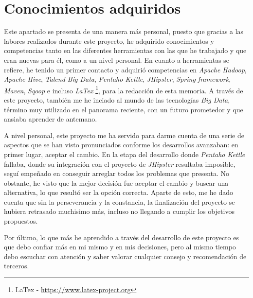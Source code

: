 \section{Conocimientos adquiridos} \label{conclusiones.conocimientos}
Este apartado se presenta de una manera más personal, puesto que gracias a las labores realizados durante este proyecto, he adquirido conocimientos y competencias tanto en las diferentes herramientas con las que he trabajado y que eran nuevas para él, como a un nivel personal. En cuanto a herramientas se refiere, he tenido un primer contacto y adquirió competencias en \textit{Apache Hadoop}, \textit{Apache Hive}, \textit{Talend Big Data}, \textit{Pentaho Kettle}, \textit{JHipster}, \textit{Spring framework}, \textit{Maven}, \textit{Sqoop} e incluso \textit{LaTex} \footnote{LaTex - \url{https://www.latex-project.org}}, para la redacción de esta memoria. A través de este proyecto, también me he inciado al mundo de las tecnologías \textit{Big Data}, término muy utilizado en el panorama reciente,  con un futuro prometedor y que ansiaba aprender de antemano. 
\par 
A nivel personal, este proyecto me ha servido para darme cuenta de una serie de aspectos que se han visto pronunciados conforme los desarrollos avanzaban: en primer lugar, aceptar el cambio. En la etapa del desarrollo donde \textit{Pentaho Kettle} fallaba, donde su integración con el proyecto de \textit{JHipster} resultaba imposible, seguí empeñado en conseguir arreglar todos los problemas que presenta. No obstante, he visto que la mejor decisión fue aceptar el cambio y buscar una alternativa, lo que resultó ser la opción correcta. Aparte de esto, me he dado cuenta que sin la perseverancia y la constancia, la finalización del proyecto se hubiera retrasado muchisimo más, incluso no llegando a cumplir los objetivos propuestos. 
\par Por último, lo que más he aprendido a través del desarrollo de este proyecto es que debo confiar más en mi mismo y en mis decisiones, pero al mismo tiempo debo escuchar con atención y saber valorar cualquier consejo y recomendación de terceros. 

 
